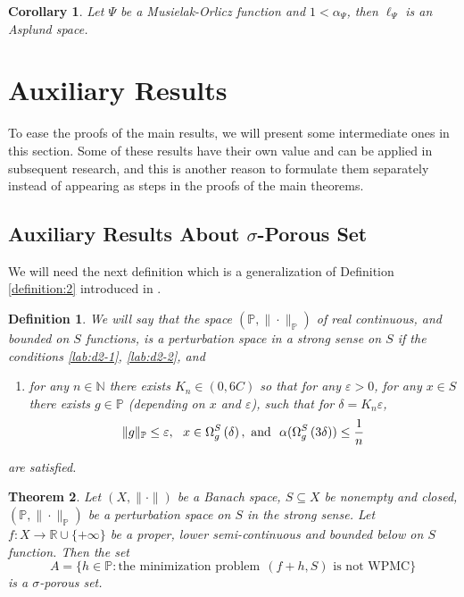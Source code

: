 \documentclass[12pt]{article}
\theoremstyle{thmstyleone}%
\newtheorem{theorem}{Theorem}
\newtheorem{cor}[theorem]{Corollary}%
\theoremstyle{thmstyletwo}%
\theoremstyle{thmstylethree}%
\newtheorem{definition}{Definition}%
\begin{document}
{\begin{cor}\label{corollary:5}
	Let $\Psi$ be a Musielak-Orlicz function and $1<\alpha_\Psi$,
	then $\ell_\Psi$ is an Asplund space.
\end{cor}


\section{Auxiliary Results}

To ease the proofs of the main results, we will present some intermediate ones in this section. Some of these results have their own value and can be applied in subsequent research, and this is another reason to formulate them separately instead of appearing as steps in the proofs of the main theorems.

\subsection{Auxiliary Results About $\sigma$-Porous Set}

We will need the next definition which is a generalization of Definition \ref{definition:2} introduced in \cite{Topalova-Zlateva}.

\begin{definition}\label{definition:11}
	We will say that the space $(\mathbb{P},\|\cdot\|_{\mathbb{P}})$ of real continuous, and bounded on $S$ functions, is a {\it perturbation space in a strong sense} on $S$ if
	the conditions \ref{lab:d2-1}, \ref{lab:d2-2}, and 
		
	\begin{enumerate}[label=(dS.ii\roman*)]
		\item\label{lab:d8-3} for any $n\in\mathbb{N}$ there exists $K_n\in (0,6C)$ so that for any $\varepsilon>0$,  for any $x\in S$ there exists $g\in \mathbb{P}$ (de\-pend\-ing on $x$ and $\varepsilon$), such that for $\delta=K_n\varepsilon$, 
		\begin{equation}\label{equation:4}
			\|g\|_{\mathbb{P}}\leq \varepsilon,\ \ 
			x\in \Omega_{g}^S\left(\delta\right),\ \mbox{and}\ \ 
			\alpha(\Omega_{g}^S\left(3\delta\right))\leq {1\over n}
		\end{equation}
	\end{enumerate}
	are satisfied.
\end{definition}

\begin{theorem}\label{theorem:7} 
	Let $(X,\|\cdot\|)$ be a Banach space, $S\subseteq X$ be nonempty and closed, $(\mathbb{P},\|\cdot\|_{\mathbb{P}})$ be a perturbation space on $S$ in the strong sense.	
	Let $f : X \rightarrow \mathbb{R} \cup \{+\infty\}$ be a proper, lower semi-continuous and bounded below on $S$ function. Then the set 
	$$
	A=\Big\{h\in \mathbb{P}: \mbox{the minimization problem}\ \  (f+h,S) \mbox { is not WPMC}\Big\}
	$$
	is a $\sigma$-porous set.
\end{theorem}

}
\end{document}
